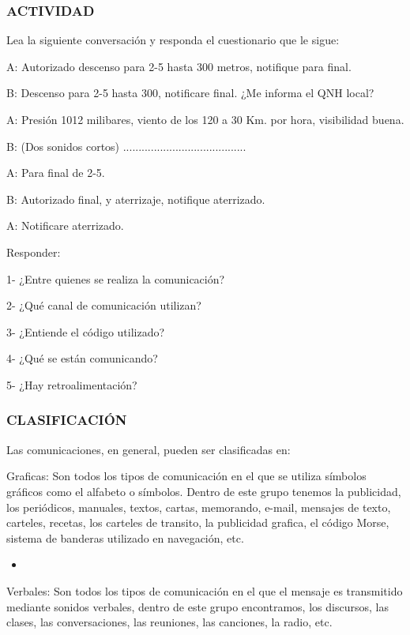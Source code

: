 \subsubsection*{ACTIVIDAD}
Lea la siguiente conversación y responda el cuestionario que le sigue:

A: Autorizado descenso para 2-5 hasta 300 metros, notifique para final.

B: Descenso para 2-5 hasta 300, notificare final. ¿Me informa el QNH local?

A: Presión 1012 milibares, viento de los 120 a 30 Km. por hora, visibilidad buena.

B: (Dos sonidos cortos) ........................................

A: Para final de 2-5.

B: Autorizado final, y aterrizaje, notifique aterrizado.

A: Notificare aterrizado.

Responder:

1- ¿Entre quienes se realiza la comunicación?

2- ¿Qué canal de comunicación utilizan?

3- ¿Entiende el código utilizado?

4- ¿Qué se están comunicando?

5- ¿Hay retroalimentación?

\subsubsection*{CLASIFICACIÓN}
Las comunicaciones, en general, pueden ser clasificadas en:

Graficas: Son todos los tipos de comunicación en el que se utiliza símbolos gráficos como el alfabeto o símbolos. Dentro de este grupo tenemos la publicidad, los periódicos, manuales, textos, cartas, memorando, e-mail, mensajes de texto, carteles, recetas, los carteles de transito, la publicidad grafica, el código Morse, sistema de banderas utilizado en navegación, etc.

\begin{itemize}
  \item 
\end{itemize}


Verbales: Son todos los tipos de comunicación en el que el mensaje es transmitido mediante sonidos verbales, dentro de este grupo encontramos, los discursos, las clases, las conversaciones, las reuniones, las canciones, la radio, etc.


